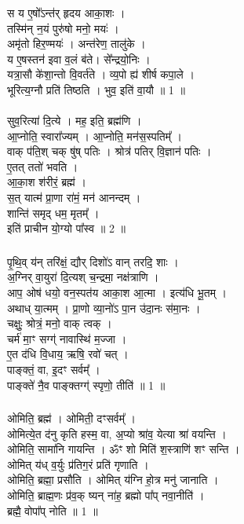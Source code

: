 \subsubsection{}
स य ए॒षो᳚ऽन्त॑र् हृदय आका॒शः ।\\
तस्मि॑न् न॒यं पुरु॑षो मनो॒ मयः॑ । \\
अमृ॑तो हिर॒ण्मयः॑ । अन्त॑रेण॒ तालु॑के । \\
य ए॒षस्तन॑ इवा {\small{}} व॒लं ब॑ते। से᳚न्द्रयो॒निः ।\\
यत्रा॒सौ के॑शा॒न्तो वि॒वर्त॑ते । व्य॒पो ह्य॑ शीर्ष कपा॒ले ।\\
भूरित्य॒ग्नौ प्रति॑ तिष्ठति । भुव॒ इति॑ वा॒यौ ॥ 1 ॥\\
\\
सुव॒रित्या॑ दि॒त्ये । मह॒ इति॒ ब्रह्म॑णि ।\\
आ॒प्नोति॒ स्वारा᳚ज्यम् । आ॒प्नोति॒ मन॑स॒स्पतिम्᳚ । \\
वाक् प॑ति॒श् चक् षु॑ष् पतिः । श्रोत्र॑ पतिर् वि॒ज्ञान॑ पतिः ।\\
ए॒तत् ततो॑ भवति ।\\
आ॒का॒श श॑रीरं॒ ब्रह्म॑ ।\\
स॒त् यात्म॑ प्रा॒णा रा॑मं॒ मन॑ आनन्दम् ।\\
शान्ति॑ समृद् धम॒ मृतम्᳚ ।\\
इति॑ प्राचीन यो॒ग्यो पा᳚स्व ॥ 2 ॥\\
\subsubsection{}
पृ॒थि॒व् य॑न् तरि॑क्षं॒ द्यौर् दिशो॑ऽ वान् तरदि॒ शाः ।\\
अ॒ग्निर् वा॒युरा॑ दि॒त्यश् च॒न्द्रमा॒ नक्ष॑त्राणि ।\\
आप॒ ओष॑ धयो॒ वन॒स्पत॑य आका॒श आ॒त्मा । इत्य॑धि भू॒तम् ।\\
अथाध् या॒त्मम् । प्रा॒णो व्या॒नो॑ऽ पा॒न उ॑दा॒नः स॑मा॒नः ।\\
चक्षुः॒ श्रोत्रं॒ मनो॒ वाक् त्वक् ।\\
चर्म॑ मा॒ꣳ सग्ग्॑ नावास्थि॑ म॒ज्जा ।\\
ए॒त द॑धि वि॒धाय॒ ऋषि॒ रवो॑ चत् ।\\
पाङ्क्तं॒ वा, इ॒दꣳ सर्वम्᳚ ।\\
पाङ्क्ते॑ नै॒व पाङ्क्तग्ग्॑ स्पृणो॒ तीति॑ ॥ 1 ॥\\
\subsubsection{}
ओमिति॒ ब्रह्म॑ । ओमिती॒ दꣳसर्वम्᳚ ।\\
ओमित्ये॒त द॑नु कृति हस्म॒ वा, अ॒प्यो श्रा॑व॒ येत्या श्रा॑ वयन्ति ।\\
ओमिति॒ सामा॑नि गायन्ति । ॐꣳ शो मिति॑ श॒स्त्राणि॑ शꣳ सन्ति ।\\
ओमित् य॑ध् व॒र्युः प्र॑तिग॒रं प्रति॑ गृणाति ।\\
ओमिति॒ ब्रह्मा॒ प्रसौ॑ति । ओमित् य॑ग्नि हो॒त्र मनु॑ जानाति ।\\
ओमिति॒ ब्राह्म॒णः प्र॑व॒क् ष्यन् ना॑ह॒ ब्रह्मो पा᳚प् नवा॒नीति॑ ।\\
ब्रह्मै॒ वोपा᳚प् नोति ॥ 1 ॥\\
